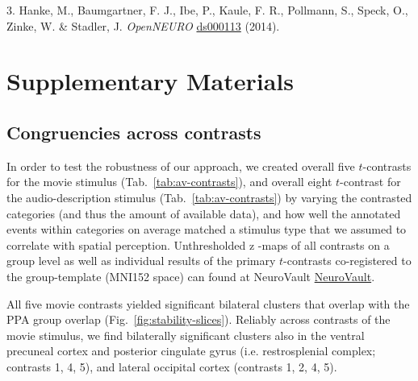 \documentclass[english]{article}
\begin{document}
3. Hanke, M., Baumgartner, F. J., Ibe, P., Kaule, F. R., Pollmann, S., Speck,
O., Zinke, W. \& Stadler, J. \emph{OpenNEURO}
\href{https://openneuro.org/datasets/ds000113}{ds000113} (2014). 


\appendix

\pagebreak[4]


\section{Supplementary Materials}

\subsection{Congruencies across contrasts}


In order to test the robustness of our approach, we created overall five
$t$-contrasts for the movie stimulus (Tab.~\ref{tab:av-contrasts}), and
overall eight $t$-contrast for the audio-description stimulus (Tab.~\ref{tab:av-contrasts})
by varying the contrasted categories (and thus the
amount of available data), and how well the annotated events within categories
on average matched a stimulus type that we assumed to correlate with spatial
perception.
Unthresholded z -maps of all contrasts on a group level as well as individual
results of the primary $t$-contrasts co-registered to the group-template (MNI152
space) can found at NeuroVault
\href{https://neurovault.org/collections/KADGMGVZ/}{NeuroVault}.


All five movie contrasts yielded significant bilateral clusters that
overlap with the PPA group overlap (Fig.~\ref{fig:stability-slices}).
Reliably across contrasts of the movie stimulus, we find bilaterally
significant clusters also in the ventral precuneal cortex and posterior
cingulate gyrus (i.e. restrosplenial complex; contrasts 1, 4, 5), and lateral
occipital cortex (contrasts 1, 2, 4, 5).
\end{document}
